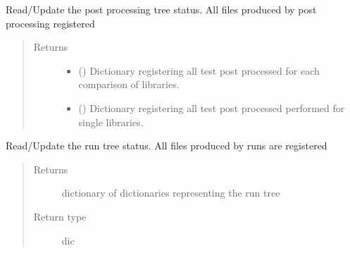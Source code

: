 \documentclass[letterpaper,10pt,english]{sphinxmanual}
\begin{document}
\begin{fulllineitems}
\begin{fulllineitems}
\label{\detokenize{api/initobjects:status.Status.update_pp_status}}
Read/Update the post processing tree status. All files produced by
post processing registered
\begin{quote}\begin{description}
\item[{Returns}] \leavevmode
\begin{itemize}
\item {} 
 () \textendash{} Dictionary registering all test post processed for each
comparison of libraries.

\item {} 
 () \textendash{} Dictionary registering all test post processed performed for
single libraries.

\end{itemize}


\end{description}\end{quote}

\end{fulllineitems}


\begin{fulllineitems}
\label{\detokenize{api/initobjects:status.Status.update_run_status}}
Read/Update the run tree status. All files produced by runs are
registered
\begin{quote}\begin{description}
\item[{Returns}] \leavevmode
{} \textendash{} dictionary of dictionaries representing the run tree

\item[{Return type}] \leavevmode
dic

\end{description}\end{quote}

\end{fulllineitems}


\end{fulllineitems}
\end{document}
